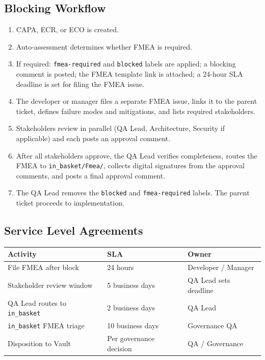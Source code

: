 \subsection{Blocking Workflow}

\begin{enumerate}
  \item CAPA, ECR, or ECO is created.
  \item Auto-assessment determines whether FMEA is required.
  \item If required: \texttt{fmea-required} and \texttt{blocked} labels are applied;
        a blocking comment is posted; the FMEA template link is attached; a 24-hour
        SLA deadline is set for filing the FMEA issue.
  \item The developer or manager files a separate FMEA issue, links it to the parent
        ticket, defines failure modes and mitigations, and lists required stakeholders.
  \item Stakeholders review in parallel (QA Lead, Architecture, Security if applicable)
        and each posts an approval comment.
  \item After all stakeholders approve, the QA Lead verifies completeness, routes the
        FMEA to \texttt{in\_basket/Fmea/}, collects digital signatures from the approval
        comments, and posts a final approval comment.
  \item The QA Lead removes the \texttt{blocked} and \texttt{fmea-required} labels.
        The parent ticket proceeds to implementation.
\end{enumerate}

\subsection{Service Level Agreements}

\begin{center}
\begin{tabular}{lll}
\toprule
Activity & SLA & Owner \\
\midrule
File FMEA after block & 24 hours & Developer / Manager \\
Stakeholder review window & 5 business days & QA Lead sets deadline \\
QA Lead routes to \texttt{in\_basket} & 2 business days & QA Lead \\
\texttt{in\_basket} FMEA triage & 10 business days & Governance QA \\
Disposition to Vault & Per governance decision & QA / Governance \\
\bottomrule
\end{tabular}
\end{center}

